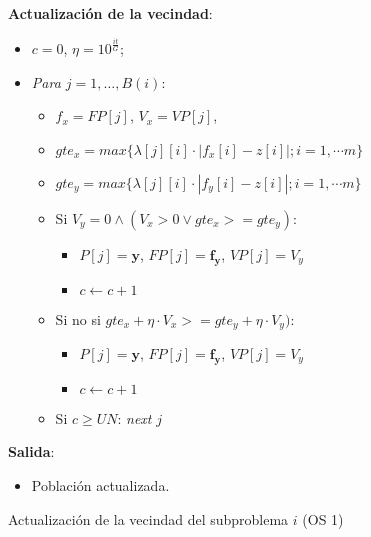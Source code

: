 \begin{center}
\begin{minipage}[H]{0.8\linewidth}
\begin{algorithm}[H]
 \textbf{Actualización de la vecindad}:\\
        \begin{itemize}
        	\vspace{0.15cm} \item $c=0$,  $\eta= 10^{\frac{it}{G}}$;
        	\vspace{0.15cm}\item \textit{Para $j=1, \dots, B(i)$}:
        	\begin{itemize}
        		\vspace{0.15cm}\item $f_x=FP[j]$, $V_x=VP[j]$, 
        		\vspace{0.15cm}\item $gte_x = max \{\lambda[j][i] \cdot  \left\vert f_x[i]-z[i] \right\vert; i=1, \cdots m\}$
        		\vspace{0.15cm}\item $gte_y = max \{\lambda[j][i] \cdot  \left\vert f_y[i]-z[i] \right\vert; i=1, \cdots m\}$
        		\vspace{0.15cm}\item Si $V_y=0 \wedge (V_x>0 \vee gte_x >= gte_y)$:
            	\begin{itemize}
            		\vspace{0.15cm}\item $P[j]=\boldsymbol{y}$, $FP[j]=\boldsymbol{f_y}$, $VP[j]=V_y$
            		\vspace{0.15cm}\item $c \gets c + 1$
				\end{itemize}   
				
				\vspace{0.15cm}\item Si no si $gte_x + \eta \cdot V_x >= gte_y + \eta \cdot V_y)$:
            	\begin{itemize}
            		\vspace{0.15cm}\item $P[j]=\boldsymbol{y}$, $FP[j]=\boldsymbol{f_y}$, $VP[j]=V_y$
            		\vspace{0.15cm}\item $c \gets c + 1$
				\end{itemize}  
				         	 
            	\vspace{0.15cm}\item Si $c \geq UN$: \textit{next} $j$
        	\end{itemize}
        \end{itemize}
    \vspace{0.3cm} 
    
    \textbf{Salida}:
    \begin{itemize}
        \item Población actualizada.
    \end{itemize}
 \caption{Actualización de la vecindad del subproblema $i$ (OS 1)}
 \label{alg:5}
\end{algorithm}
\end{minipage} \\
\end{center}



